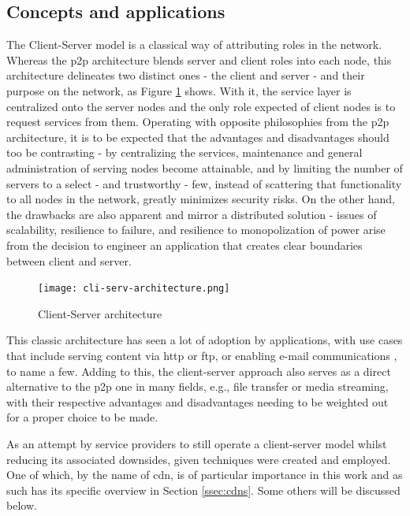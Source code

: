 \subsection{Concepts and applications}

    The Client-Server model is a classical way of attributing roles in the network.
    Whereas the \gls{p2p} architecture blends server and client roles into each node, this architecture delineates two distinct ones - the client and server - and their purpose on the network, as Figure \ref{fig:cli-serv-architecture} shows.
    With it, the service layer is centralized onto the server nodes and the only role expected of client nodes is to request services from them.
    Operating with opposite philosophies from the \gls{p2p} architecture, it is to be expected that the advantages and disadvantages should too be contrasting - by centralizing the services, maintenance and general administration of serving nodes become attainable, and by limiting the number of servers to a select - and trustworthy - few, instead of scattering that functionality to all nodes in the network, greatly minimizes security risks.
    On the other hand, the drawbacks are also apparent and mirror a distributed solution - issues of scalability, resilience to failure, and resilience to monopolization of power arise from the decision to engineer an application that creates clear boundaries between client and server.

    \begin{figure}[!h]
    \centering
    \texttt{[image: cli-serv-architecture.png]}
    \caption{Client-Server architecture }
    \label{fig:cli-serv-architecture}
    \end{figure}

    This classic architecture has seen a lot of adoption by applications, with use cases that include serving content via \gls{http} or \gls{ftp}, or enabling e-mail communications \cite{cliserv-p2p}, to name a few.
    Adding to this, the client-server approach also serves as a direct alternative to the \gls{p2p} one in many fields, e.g., file transfer or media streaming, with their respective advantages and disadvantages needing to be weighted out for a proper choice to be made.

    As an attempt by service providers to still operate a client-server model whilst reducing its associated downsides, given techniques were created and employed.
    One of which, by the name of \gls{cdn}, is of particular importance in this work and as such has its specific overview in Section \ref{ssec:cdns}.
    Some others will be discussed below.

